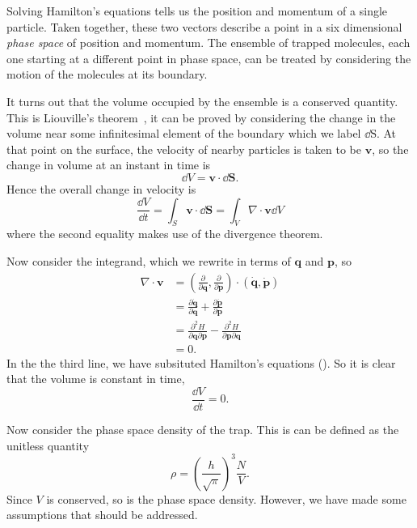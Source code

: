 Solving Hamilton's equations tells us the position and momentum of a single
particle. Taken together, these two vectors describe a point in a six
dimensional \emph{phase space} of position and momentum. The ensemble of
trapped molecules, each one starting at a different point in phase space, can
be treated by considering the motion of the molecules at its
boundary.~\cite{Hand1998}

It turns out that the volume occupied by the ensemble is a conserved quantity.
This is Liouville's theorem~\cite{Landau1982}, it can be proved by considering
the change in the volume near some infinitesimal element of the boundary which
we label $\dd \mathrm{S}$. At that point on the surface, the velocity of nearby
particles is taken to be $\mathbf{v}$, so the change in volume at an instant in
time is~\cite{Hand1998}
%
\begin{equation}
  \dd V = \mathbf{v} \cdot \dd \mathbf{S}.
\end{equation}
%
Hence the overall change in velocity is
%
\begin{equation}
  \frac{\dd V}{\dd t} = \int_S \mathbf{v} \cdot \dd \mathbf{S} = \int_V \nabla 
  \cdot \mathbf{v} \dd V
\end{equation}
where the second equality makes use of the divergence theorem.

Now consider the integrand, which we rewrite in terms of $\mathbf{q}$ and
$\mathbf{p}$, so
%
\begin{align}
  \nabla \cdot \mathbf{v} &= \left(\frac{\partial}{\partial \mathbf{q}},
  \frac{\partial}{\partial \mathbf{p}}\right) \cdot \left(\dot{\mathbf{q}},
  \dot{\mathbf{p}}\right) \\
  &= \frac{\partial \dot{\mathbf{q}}}{\partial \mathbf{q}} +
  \frac{\partial \dot{\mathbf{p}}}{\partial \mathbf{p}} \\
  & = \frac{\partial^2 H}{\partial \mathbf{q} \partial \mathbf{p}}
  - \frac{\partial^2 H}{\partial \mathbf{p} \partial \mathbf{q}} \\
  & = 0.
\end{align}
In the the third line, we have subsituted Hamilton's equations
().  So it is clear that the volume is constant in
time,
%
\begin{equation}
  \frac{\dd V}{\dd t} = 0.
\end{equation}

Now consider the phase space density of the trap. This is can be defined as the
unitless quantity~\cite{PhysRevA.52.1423}
%
\begin{equation}
  \rho = \left(\frac{h}{\sqrt{\pi}}\right)^3 \frac{N}{V}.
\end{equation}
%
Since $V$ is conserved, so is the phase space density. However, we have made
some assumptions that should be addressed.

